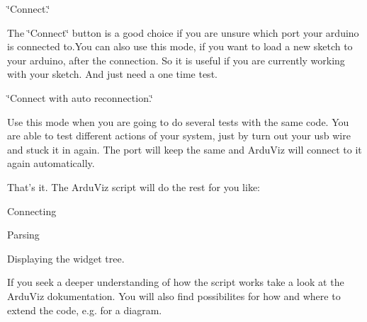 \begin{DoxyItemize}
\item \char`\"{}\+Connect.\char`\"{}
\begin{DoxyItemize}
\item The \char`\"{}\+Connect\char`\"{} button is a good choice if you are unsure which port your arduino is connected to.\+You can also use this mode, if you want to load a new sketch to your arduino, after the connection. So it is useful if you are currently working with your sketch. And just need a one time test.
\end{DoxyItemize}
\item \char`\"{}\+Connect with auto reconnection.\char`\"{}
\begin{DoxyItemize}
\item Use this mode when you are going to do several tests with the same code. You are able to test different actions of your system, just by turn out your usb wire and stuck it in again. The port will keep the same and Ardu\+Viz will connect to it again automatically.
\end{DoxyItemize}
\end{DoxyItemize}

That's it. The Ardu\+Viz script will do the rest for you like\+:
\begin{DoxyItemize}
\item Connecting
\item Parsing
\item Displaying the widget tree.
\end{DoxyItemize}

If you seek a deeper understanding of how the script works take a look at the Ardu\+Viz dokumentation. You will also find possibilites for how and where to extend the code, e.\+g. for a diagram. 